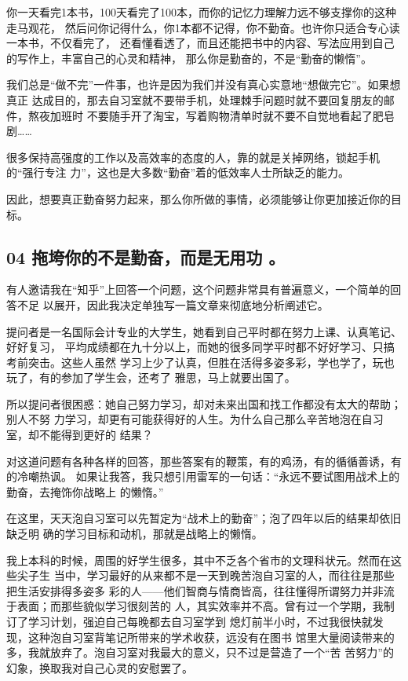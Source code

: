 \documentclass[11pt]{ctexart}
\begin{document}
{{{{你一天看完1本书，100天看完了100本，而你的记忆力理解力远不够支撑你的这种走马观花，
然后问你记得什么，你1本都不记得，你不勤奋。也许你只适合专心读一本书，不仅看完了，
还看懂看透了，而且还能把书中的内容、写法应用到自己的写作上，丰富自己的心灵和精神，
那么你是勤奋的，不是“勤奋的懒惰”。

我们总是“做不完”一件事，也许是因为我们并没有真心实意地“想做完它”。如果想真正
达成目的，那去自习室就不要带手机，处理棘手问题时就不要回复朋友的邮件，熬夜加班时
不要随手开了淘宝，写着购物清单时就不要不自觉地看起了肥皂剧……

很多保持高强度的工作以及高效率的态度的人，靠的就是关掉网络，锁起手机的“强行专注
力”，这也是大多数“勤奋”着的低效率人士所缺乏的能力。

因此，想要真正勤奋努力起来，那么你所做的事情，必须能够让你更加接近你的目标。
\subsection{04 拖垮你的不是勤奋，而是无用功 。}
\label{sec:orgc02eb6b}
有人邀请我在“知乎”上回答一个问题，这个问题非常具有普遍意义，一个简单的回答不足
以展开，因此我决定单独写一篇文章来彻底地分析阐述它。


提问者是一名国际会计专业的大学生，她看到自己平时都在努力上课、认真笔记、好好复习，
平均成绩都在九十分以上，而她的很多同学平时都不好好学习、只搞考前突击。这些人虽然
学习上少了认真，但胜在活得多姿多彩，学也学了，玩也玩了，有的参加了学生会，还考了
雅思，马上就要出国了。

所以提问者很困惑：她自己努力学习，却对未来出国和找工作都没有太大的帮助；别人不努
力学习，却更有可能获得好的人生。为什么自己那么辛苦地泡在自习室，却不能得到更好的
结果？

对这道问题有各种各样的回答，那些答案有的鞭策，有的鸡汤，有的循循善诱，有的冷嘲热讽。
如果让我答，我只想引用雷军的一句话：“永远不要试图用战术上的勤奋，去掩饰你战略上
的懒惰。”

在这里，天天泡自习室可以先暂定为“战术上的勤奋”；泡了四年以后的结果却依旧缺乏明
确的学习目标和动机，那就是战略上的懒惰。

我上本科的时候，周围的好学生很多，其中不乏各个省市的文理科状元。然而在这些尖子生
当中，学习最好的从来都不是一天到晚苦泡自习室的人，而往往是那些把生活安排得多姿多
彩的人——他们智商与情商皆高，往往懂得所谓努力并非流于表面；而那些貌似学习很刻苦的
人，其实效率并不高。曾有过一个学期，我制订了学习计划，强迫自己每晚都去自习室学到
熄灯前半小时，不过我很快就发现，这种泡自习室背笔记所带来的学术收获，远没有在图书
馆里大量阅读带来的多，我就放弃了。泡自习室对我最大的意义，只不过是营造了一个“苦
苦努力”的幻象，换取我对自己心灵的安慰罢了。

}}}}
\end{document}
